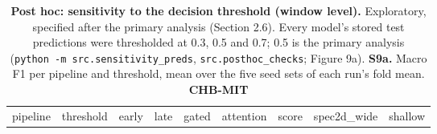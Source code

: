 \documentclass[11pt,a4paper]{article}
\begin{document}
\begin{longtable}[]{@{}
  >{\raggedright\arraybackslash}p{}
  >{\raggedright\arraybackslash}p{}
  >{\raggedright\arraybackslash}p{}
  >{\raggedright\arraybackslash}p{}
  >{\raggedright\arraybackslash}p{}
  >{\raggedright\arraybackslash}p{}
  >{\raggedright\arraybackslash}p{}
  >{\raggedright\arraybackslash}p{}
  >{\raggedright\arraybackslash}p{}@{}}
\caption{\textbf{Post hoc: sensitivity to the decision threshold (window level).} Exploratory, specified after the primary analysis (Section 2.6). Every model's stored test predictions were thresholded at 0.3, 0.5 and 0.7; 0.5 is the primary analysis (\protect\texttt{python\ -m\ src.sensitivity\_preds}, \nolinkurl{src.posthoc_checks}; Figure 9a). \textbf{S9a.} Macro F1 per pipeline and threshold, mean over the five seed sets of each run's fold mean. \textbf{CHB-MIT}}\tabularnewline
\toprule\noalign{}
\begin{minipage}[b]{\linewidth}\raggedright
pipeline
\end{minipage} & \begin{minipage}[b]{\linewidth}\raggedright
threshold
\end{minipage} & \begin{minipage}[b]{\linewidth}\raggedright
early
\end{minipage} & \begin{minipage}[b]{\linewidth}\raggedright
late
\end{minipage} & \begin{minipage}[b]{\linewidth}\raggedright
gated
\end{minipage} & \begin{minipage}[b]{\linewidth}\raggedright
attention
\end{minipage} & \begin{minipage}[b]{\linewidth}\raggedright
score
\end{minipage} & \begin{minipage}[b]{\linewidth}\raggedright
spec2d\_wide
\end{minipage} & \begin{minipage}[b]{\linewidth}\raggedright
shallow
\end{minipage} \\

\end{longtable}
\end{document}
